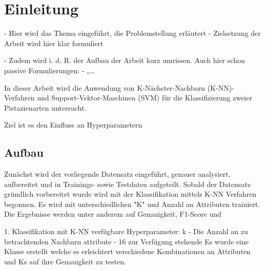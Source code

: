 
\section{Einleitung}

- Hier wird das Thema eingeführt, die Problemstellung erläutert 
- Zielsetzung der Arbeit wird hier klar formuliert

- Zudem wird i. d. R. der Aufbau der Arbeit kurz umrissen.
Auch hier schon passive Formulierungen:
- „…


In dieser Arbeit wird die Anwendung von K-Nächster-Nachbarn (K-NN)-Verfahren und Support-Vektor-Maschinen (SVM) für die Klassifizierung zweier Pistazienarten untersucht. 

Ziel ist es den Einfluss an Hyperparametern 

\subsection{Aufbau}
Zunächst wird der vorliegende Datensatz eingeführt, genauer analysiert, aufbereitet und in Trainings- sowie Testdaten aufgeteilt.
Sobald der Datensatz gründlich vorbereitet wurde wird mit der Klassifikation mittels K-NN Verfahren begonnen. 
Es wird mit unterschiedlichen "K" und Anzahl an Attributen trainiert. Die Ergebnisse werden unter anderem auf Genauigkeit, F1-Score und 

1. Klassifikation mit K-NN
verfügbare Hyperparameter:
 k - Die Anzahl an zu betrachtenden Nachbarn
 attribute - 16 zur Verfügung stehende
Es wurde eine Klasse erstellt welche es erleichtert verschiedene Kombinationen an Attributen und Ks auf ihre Genauigkeit zu testen. 
